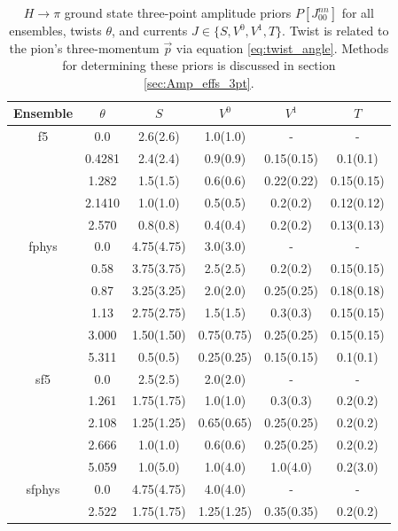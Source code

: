 \begin{table}[]
    \centering
    \caption{$H\rightarrow\pi$ ground state three-point amplitude priors $P[J_{00}^{nn}]$ for all ensembles, twists $\theta$, and currents $J \in \{S,V^0,V^1,T\}$.  Twist is related to the pion's three-momentum $\vec{p}$ via equation \ref{eq:twist_angle}.  Methods for determining these priors is discussed in section \ref{sec:Amp_effs_3pt}.}
    \label{tab:3ptpriors_Hpi}
    \begin{tabular}{c c | c c c c}
    \hline
    \hline
    Ensemble & $\theta$ & $S$ & $V^0$ & $V^1$ & $T$ \\
    \hline
    \hline
    f5 & 0.0 & 2.6(2.6) & 1.0(1.0) & - & - \\
       & 0.4281 & 2.4(2.4) & 0.9(0.9) & 0.15(0.15) & 0.1(0.1)\\
       & 1.282 & 1.5(1.5) & 0.6(0.6) & 0.22(0.22) & 0.15(0.15)\\
       & 2.1410 & 1.0(1.0) & 0.5(0.5) & 0.2(0.2) & 0.12(0.12)\\
       & 2.570 & 0.8(0.8) & 0.4(0.4) & 0.2(0.2) & 0.13(0.13)\\
    \hline
    fphys & 0.0 & 4.75(4.75) & 3.0(3.0) & - & - \\
          & 0.58 & 3.75(3.75) & 2.5(2.5) & 0.2(0.2) & 0.15(0.15)\\
          & 0.87 & 3.25(3.25) & 2.0(2.0) & 0.25(0.25) & 0.18(0.18)\\
          & 1.13 & 2.75(2.75) & 1.5(1.5) &0.3(0.3) & 0.15(0.15)\\
          & 3.000 & 1.50(1.50) & 0.75(0.75) & 0.25(0.25) & 0.15(0.15)\\
          & 5.311 & 0.5(0.5) & 0.25(0.25) & 0.15(0.15) & 0.1(0.1)\\
    \hline
    sf5   & 0.0   & 2.5(2.5)   & 2.0(2.0)   & -          & -       \\    
          & 1.261 & 1.75(1.75) & 1.0(1.0)   & 0.3(0.3)   & 0.2(0.2)\\ 
          & 2.108 & 1.25(1.25) & 0.65(0.65) & 0.25(0.25) & 0.2(0.2)\\
          & 2.666 & 1.0(1.0)   & 0.6(0.6)   & 0.25(0.25) & 0.2(0.2)\\
          & 5.059 & 1.0(5.0)   & 1.0(4.0)   & 1.0(4.0)   & 0.2(3.0)\\
    \hline
    sfphys & 0.0    & 4.75(4.75) & 4.0(4.0)   & -          & - \\ 
           & 2.522  & 1.75(1.75) & 1.25(1.25) & 0.35(0.35) & 0.2(0.2)\\ 

\end{tabular}
\end{table}
